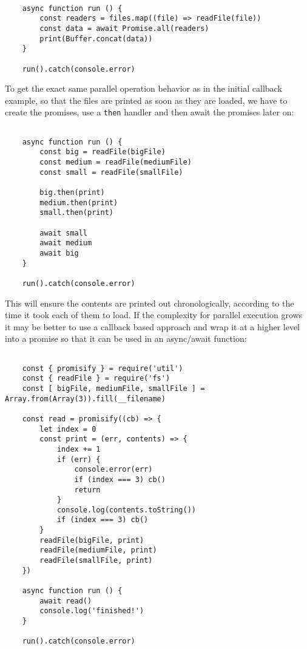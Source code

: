 \documentclass{scrartcl}
\begin{document}
\begin{lstlisting}[style=ES6]

    async function run () {
        const readers = files.map((file) => readFile(file))
        const data = await Promise.all(readers)
        print(Buffer.concat(data))
    }

    run().catch(console.error)

\end{lstlisting}

To get the exact same parallel operation behavior as in the initial callback example, so that the files are printed as soon as they are loaded, we have to create the promises, use a \lstinline|then| handler and then await the promises later on:

\begin{lstlisting}[style=ES6]

    async function run () {
        const big = readFile(bigFile)
        const medium = readFile(mediumFile)
        const small = readFile(smallFile)

        big.then(print)
        medium.then(print)
        small.then(print)

        await small
        await medium
        await big
    }

    run().catch(console.error)

\end{lstlisting}


This will ensure the contents are printed out chronologically, according to the time it took each of them to load. If the complexity for parallel execution grows it may be better to use a callback based approach and wrap it at a higher level into a promise so that it can be used in an async/await function:

\begin{lstlisting}[style=ES6]

    const { promisify } = require('util')
    const { readFile } = require('fs')
    const [ bigFile, mediumFile, smallFile ] = Array.from(Array(3)).fill(__filename)

    const read = promisify((cb) => {
        let index = 0
        const print = (err, contents) => {
            index += 1
            if (err) {
                console.error(err)
                if (index === 3) cb()
                return
            }
            console.log(contents.toString())
            if (index === 3) cb()
        }
        readFile(bigFile, print)
        readFile(mediumFile, print)
        readFile(smallFile, print)
    })

    async function run () {
        await read()
        console.log('finished!')
    }

    run().catch(console.error)
\end{lstlisting}
\end{document}
